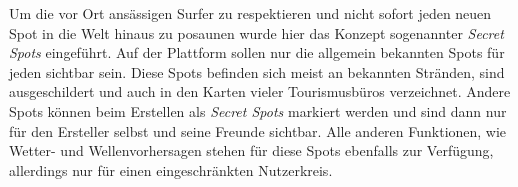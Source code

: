 Um die vor Ort ansässigen Surfer zu respektieren und nicht sofort
jeden neuen Spot in die Welt hinaus zu posaunen wurde hier das Konzept
sogenannter \textit{Secret Spots} eingeführt. Auf der Plattform sollen
nur die allgemein bekannten Spots für jeden sichtbar sein. Diese Spots
befinden sich meist an bekannten Stränden, sind ausgeschildert und
auch in den Karten vieler Tourismusbüros verzeichnet. Andere Spots
können beim Erstellen als \textit{Secret Spots} markiert werden und
sind dann nur für den Ersteller selbst und seine Freunde
sichtbar. Alle anderen Funktionen, wie Wetter- und Wellenvorhersagen
stehen für diese Spots ebenfalls zur Verfügung, allerdings nur für
einen eingeschränkten Nutzerkreis.

